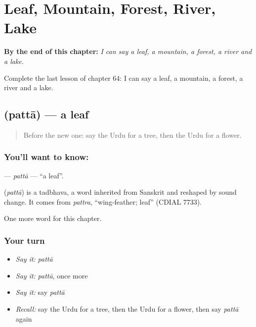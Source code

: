
\chapter{Leaf, Mountain, Forest, River, Lake}
\label{ch:ur-leaf-mountain-forest-river-lake}

\begin{chapteropening}
\textbf{By the end of this chapter:} \emph{I can say a leaf, a mountain, a forest, a river and a lake.}

Complete the last lesson of chapter 64: I can say a leaf, a mountain, a forest, a river and a lake.
\end{chapteropening}

\section[\texorpdfstring{\ur{پتا} (pattā)}{پتا (pattā)}]{ (pattā) — a leaf}

\label{lesson:UR-C64-patta}



\begin{quote}
Before the new one: say the Urdu for a tree, then the Urdu for a flower.
\end{quote}

\subsection*{You'll want to know: }
\textbf{} — \emph{pattā} — \textquotedblleft{}a leaf\textquotedblright{}.

\begin{cousinweb}
\textbf{} (\emph{pattā}) is a tadbhava, a word inherited from Sanskrit and reshaped by sound change. It comes from \emph{pattra}, \textquotedblleft{}wing-feather; leaf\textquotedblright{} (CDIAL 7733).
\end{cousinweb}

\begin{grammarlens}[title={What you've built}]
One more word for this chapter.
\end{grammarlens}

\subsection*{Your turn}
\begin{itemize}
\raggedright
  \item \emph{Say it:} \emph{pattā}
  \item \emph{Say it:} \emph{pattā}, once more
  \item \emph{Say it:} say \emph{pattā}
  \item \emph{Recall:} say the Urdu for a tree, then the Urdu for a flower, then say \emph{pattā} again
\end{itemize}

